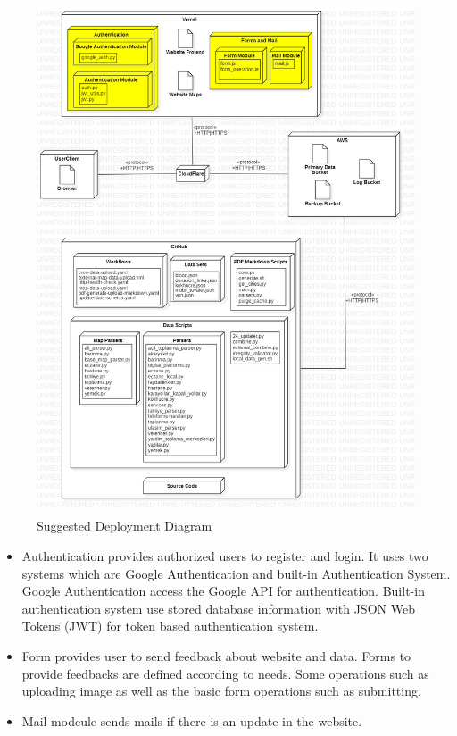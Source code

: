 \begin{figure}[H]
  \centering
  \includegraphics[width=\linewidth]{img/deployment-diagram-s5.jpg}
  \caption{Suggested Deployment Diagram}
\end{figure}

\begin{itemize}
  \item Authentication provides authorized users to register and login. It uses two systems which are Google Authentication and built-in Authentication System.
  \subitem Google Authentication access the Google API for authentication. Built-in authentication system use stored database information with JSON Web Tokens (JWT) for token based authentication system.
  \item Form provides user to send feedback about website and data. Forms to provide feedbacks are defined according to needs. Some operations such as uploading image as well as the basic form operations such as submitting.
  \item Mail modeule sends mails if there is an update in the website.
\end{itemize}

